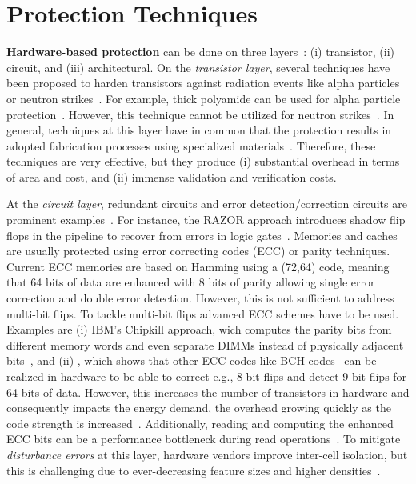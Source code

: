 \section{Protection Techniques}
\label{sec:RelatedWork_Hardware}

\textbf{Hardware-based protection} can be done on three layers~\cite{DBLP:books/daglib/0037372}: (i) transistor, (ii) circuit, and (iii) architectural. On the \emph{transistor layer}, several techniques have been proposed to harden transistors against radiation events like alpha particles or neutron strikes~\cite{itoh1980single,kohara1990mechanism}. For example, thick polyamide can be used for alpha particle protection~\cite{itoh1980single,kohara1990mechanism}. However, this technique cannot be utilized for neutron strikes~\cite{DBLP:books/daglib/0037372}. In general, techniques at this layer have in common that the protection results in adopted fabrication processes using specialized materials~\cite{itoh1980single,kohara1990mechanism,DBLP:books/daglib/0037372}. Therefore, these techniques are very effective, but they produce (i) substantial overhead in terms of area and cost, and (ii) immense validation and verification costs. 

At the \emph{circuit layer}, redundant circuits and error detection/correc\-tion circuits are prominent examples~\cite{dell1997white,ernst2004razor,Kim:2007:MET:1331699.1331719,DBLP:books/daglib/0037372}. For instance, the RAZOR approach introduces shadow flip flops in the pipeline to recover from errors in logic gates~\cite{ernst2004razor}. Memories and caches are usually protected using error correcting codes (ECC) or parity techniques. Current ECC memories are based on Hamming using a (72,64) code, meaning that 64 bits of data are enhanced with 8 bits of parity allowing single error correction and double error detection. However, this is not sufficient to address multi-bit flips. To tackle multi-bit flips advanced ECC schemes have to be used. Examples are (i) IBM's Chipkill approach, wich computes the parity bits from different memory words and even separate DIMMs instead of physically adjacent bits~\cite{dell1997white}, and (ii) \cite{Kim:2007:MET:1331699.1331719}, which shows that other ECC codes like BCH-codes~\cite{moon2005error} can be realized in hardware to be able to correct e.g., 8-bit flips and detect 9-bit flips for 64 bits of data. However, this increases the number of transistors in hardware and consequently impacts the energy demand, the overhead growing quickly as the code strength is increased~\cite{Kim:2007:MET:1331699.1331719}. Additionally, reading and computing the enhanced ECC bits can be a performance bottleneck during read operations~\cite{Kim:2007:MET:1331699.1331719}. To mitigate \emph{disturbance errors} at this layer, hardware vendors improve inter-cell isolation, but this is challenging due to ever-decreasing feature sizes and higher densities~\cite{DBLP:conf/isca/KimDKFLLWLM14,DBLP:conf/date/Mutlu17}. 

